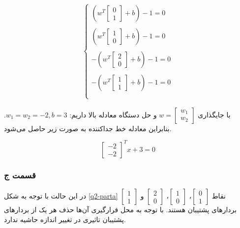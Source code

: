 \documentclass{article}
\begin{document}
\begin{align*}
    \begin{cases}
        (w^T\begin{bmatrix}0\\ 1\end{bmatrix} + b) - 1 = 0\\\\
        (w^T\begin{bmatrix}1\\ 0\end{bmatrix} + b) - 1 = 0\\\\
        - (w^T\begin{bmatrix}2\\ 0\end{bmatrix} + b) - 1 = 0\\\\
        - (w^T\begin{bmatrix}1\\ 1\end{bmatrix} + b) - 1 = 0\\\\
    \end{cases}
\end{align*}

با جایگذاری $w=\begin{bmatrix}w_1\\w_2\end{bmatrix}$ و حل دستگاه معادله بالا داریم: $w_1=w_2=-2, b=3$. بنابراین
معادله خط جداکننده به صورت زیر حاصل می‌شود.

$$\begin{bmatrix}-2\\-2\end{bmatrix}^T x + 3 = 0$$

\subsubsection*{قسمت ج}

در این حالت با توجه به شکل \ref{q2-parta} نقاط $\begin{bmatrix}0\\ 1\end{bmatrix}$، $\begin{bmatrix}1\\ 0\end{bmatrix}$،
$\begin{bmatrix}2\\ 0\end{bmatrix}$ و $\begin{bmatrix}1\\ 1\end{bmatrix}$ بردار‌های پشتیبان هستند. با توجه به محل قرارگیری آن‌ها
حذف هر یک از بردار‌های پشتیبان تاثیری در تغییر اندازه حاشیه ندارد.
\end{document}
